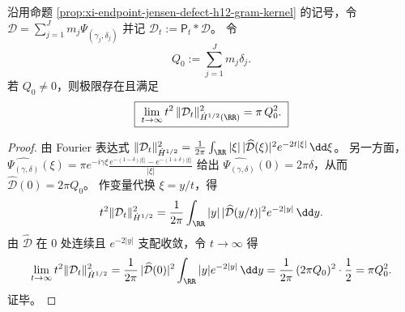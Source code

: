 \begin{theorem}\label{thm:xi-endpoint-psi-poisson-monopole-asymptotic}
沿用命题 \ref{prop:xi-endpoint-jensen-defect-h12-gram-kernel} 的记号，令
\(
\mathcal D=\sum_{j=1}^{J}m_j\Psi_{(\gamma_j,\delta_j)}
\)
并记 \(\mathcal D_t:=\mathsf P_t*\mathcal D\)。
令
\[
Q_0:=\sum_{j=1}^{J}m_j\delta_j.
\]
若 \(Q_0\neq 0\)，则极限存在且满足
\[
\boxed{\;
\lim_{t\to\infty}t^{2}\,\|\mathcal D_t\|_{\dot H^{1/2}(\RR)}^{2}
=\pi\,Q_0^{2}. \;}
\]
\end{theorem}
\begin{proof}
由 Fourier 表达式
\(
\|\mathcal D_t\|_{\dot H^{1/2}}^{2}=\frac{1}{2\pi}\int_{\RR}|\xi|\,|\widehat{\mathcal D}(\xi)|^{2}e^{-2t|\xi|}\,\dd\xi
\)。
另一方面，
\(
\widehat{\Psi_{(\gamma,\delta)}}(\xi)=\pi e^{-i\gamma\xi}\frac{e^{-(1-\delta)|\xi|}-e^{-(1+\delta)|\xi|}}{|\xi|}
\)
给出
\(
\widehat{\Psi_{(\gamma,\delta)}}(0)=2\pi\delta
\)，从而 \(\widehat{\mathcal D}(0)=2\pi Q_0\)。
作变量代换 \(\xi=y/t\)，得
\[
t^2\|\mathcal D_t\|_{\dot H^{1/2}}^{2}
=\frac{1}{2\pi}\int_{\RR}|y|\,|\widehat{\mathcal D}(y/t)|^{2}e^{-2|y|}\,\dd y.
\]
由 \(\widehat{\mathcal D}\) 在 \(0\) 处连续且 \(e^{-2|y|}\) 支配收敛，令 \(t\to\infty\) 得
\[
\lim_{t\to\infty}t^2\|\mathcal D_t\|_{\dot H^{1/2}}^{2}
=\frac{1}{2\pi}\,|\widehat{\mathcal D}(0)|^{2}\int_{\RR}|y|e^{-2|y|}\,\dd y
=\frac{1}{2\pi}\,(2\pi Q_0)^{2}\cdot \frac12
=\pi Q_0^2.
\]
证毕。
\end{proof}

